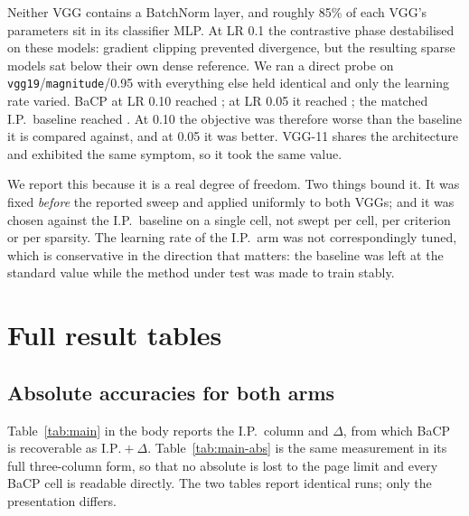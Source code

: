 Neither VGG contains a BatchNorm layer, and roughly 85\% of each VGG's parameters
sit in its classifier MLP. At LR 0.1 the contrastive phase destabilised on these
models: gradient clipping prevented divergence, but the resulting sparse models
sat below their own dense reference. We ran a direct probe on
\texttt{vgg19}/\texttt{magnitude}/0.95 with everything else held identical and
only the learning rate varied. BaCP at LR 0.10 reached
; at LR 0.05 it reached
; the matched I.P.\ baseline reached
. At 0.10 the objective was therefore worse
than the baseline it is compared against, and at 0.05 it was better. VGG-11
shares the architecture and exhibited the same symptom, so it took the same
value.

We report this because it is a real degree of freedom. Two things bound it. It
was fixed \emph{before} the reported sweep and applied uniformly to both VGGs;
and it was chosen against the I.P.\ baseline on a single cell, not swept per
cell, per criterion or per sparsity. The learning rate of the I.P.\ arm was not
correspondingly tuned, which is conservative in the direction that matters: the
baseline was left at the standard value while the method under test was made to
train stably.

\section{Full result tables}
\label{sec:app:results}

\subsection{Absolute accuracies for both arms}

Table~\ref{tab:main} in the body reports the I.P.\ column and $\Delta$, from
which BaCP is recoverable as $\mathrm{I.P.} + \Delta$.
Table~\ref{tab:main-abs} is the same measurement in its full three-column form,
so that no absolute is lost to the page limit and every BaCP cell is readable
directly. The two tables report identical runs; only the presentation differs.

